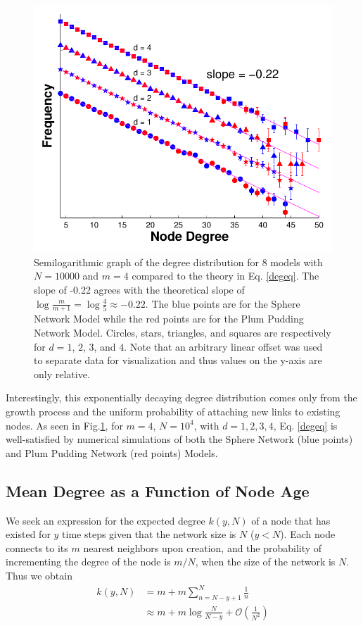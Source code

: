 \documentclass[aps,pre,reprint,superscriptaddress,amsmath,amssymb,nofootinbib]{revtex4-1}
\begin{document}
\begin{figure}
\includegraphics[width=\linewidth]{figures/figDegDist.pdf}
\caption{\label{degdist}Semilogarithmic graph of the degree distribution for 8 models with $N = 10000$ and $m = 4$ compared to the theory in Eq. \eqref{degeq}. The slope of -0.22 agrees with the theoretical slope of $\log \frac{m}{m+1} = \log \frac{4}{5} \approx -0.22$. The blue points are for the Sphere Network Model while the red points are for the Plum Pudding Network Model. Circles, stars, triangles, and squares are respectively for $d=1$, $2$, $3$, and $4$. Note that an arbitrary linear offset was used to separate data for visualization and thus values on the y-axis are only relative.}
\end{figure}

Interestingly, this exponentially decaying degree distribution comes only from the growth process and the uniform probability of attaching new links to existing nodes.  
As seen in Fig.\ref{degdist}, for $m = 4$, $N = 10^4$, with $d = 1,2,3,4$, Eq. \eqref{degeq} is well-satisfied by numerical simulations of both the Sphere Network (blue points) and Plum Pudding Network (red points) Models.

\subsection{Mean Degree as a Function of Node Age}
We seek an expression for the expected degree $k(y,N)$ of a node that has existed for $y$ time steps given that the network size is $N$ ($y < N$).
Each node connects to its $m$ nearest neighbors upon creation, and the probability of incrementing the degree of the node is $m/N$, when the size of the network is $N$.
Thus we obtain 
\begin{equation}\label{ageeq}
\begin{split}
k(y,N)& = m + m\sum_{n=N-y+1}^{N} \frac{1}{n}\\
      & \approx m + m \log \frac{N}{N-y} + \mathcal O\left(\frac{1}{N^2}\right)
\end{split}
\end{equation}
 
\end{document}
